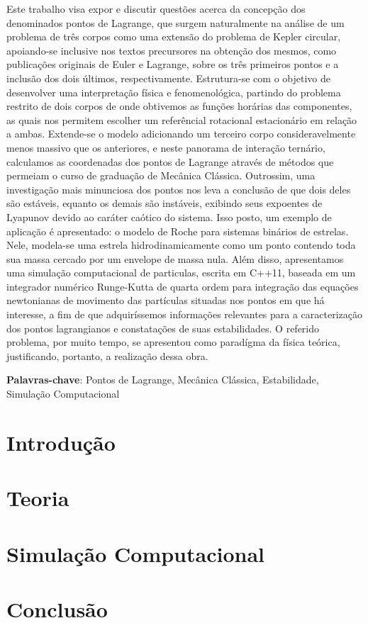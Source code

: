 \documentclass[10pt,twoside,a4paper,brazil]{abntex2}
\begin{document}
   \imprimircapa
   
   \imprimirfolhaderosto   
   
   \tableofcontents

	 \newpage
	 
   \begin{resumo}
      Este trabalho visa expor e discutir questões acerca da concepção dos denominados pontos de Lagrange, que surgem naturalmente na análise de um problema de três corpos como uma extensão do problema de Kepler circular, apoiando-se inclusive nos textos precursores na obtenção dos mesmos, como publicações originais de Euler e Lagrange, sobre os três primeiros pontos e a inclusão dos dois últimos, respectivamente. Estrutura-se com o objetivo de desenvolver uma interpretação física e fenomenológica, partindo do problema restrito de dois corpos de onde obtivemos as funções horárias das componentes, as quais nos permitem escolher um referêncial rotacional estacionário em relação a ambas. Extende-se o modelo adicionando um terceiro corpo consideravelmente menos massivo que os anteriores, e neste panorama de interação ternário, calculamos as coordenadas dos pontos de Lagrange através de métodos que permeiam o curso de graduação de Mecânica Clássica. Outrossim, uma investigação mais minunciosa dos pontos nos leva a conclusão de que dois deles são estáveis, equanto os demais são instáveis, exibindo seus expoentes de Lyapunov devido ao caráter caótico do sistema. Isso posto, um exemplo de aplicação é apresentado: o modelo de Roche para sistemas binários de estrelas. Nele, modela-se uma estrela hidrodinamicamente como um ponto contendo toda sua massa cercado por um envelope de massa nula. Além disso, apresentamos uma simulação computacional de particulas, escrita em C++11, baseada em um integrador numérico Runge-Kutta de quarta ordem para integração das equações newtonianas de movimento das partículas situadas nos pontos em que há interesse, a fim de que adquiríssemos informações relevantes para a caracterização dos pontos lagrangianos e constatações de suas estabilidades. O referido problema, por muito tempo, se apresentou como paradígma da física teórica, justificando, portanto, a realização dessa obra.

      \vspace{\onelineskip}
      \noindent
      \textbf{Palavras-chave}: Pontos de Lagrange, Mecânica Clássica, Estabilidade, Simulação Computacional
   \end{resumo}

   \chapter{Introdução}
      
      
   \chapter{Teoria}
      
     
   \chapter{Simulação Computacional}
      

   \chapter{Conclusão}
      

   
\end{document}
